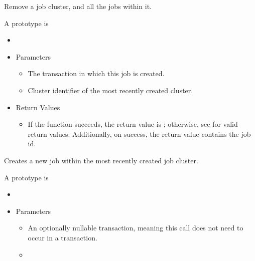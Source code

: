 \begin{description}
  Remove a job cluster, and all the jobs within it.
\item [\Code{newJob}]
  A prototype is 

  \begin{itemize}
    \item[] 
    \item[] Parameters
    \begin{itemize}
      \item[]  

      The transaction in which this job is created.
      \item[]  

      Cluster identifier of the most recently created cluster. 
    \end{itemize}
    \item[] Return Values
    \begin{itemize}
      \item[] If the function succeeds, the return value is ; 
      otherwise, see  for valid return values. Additionally,
      on success, the return value contains the job id.
    \end{itemize}
  \end{itemize}

  Creates a new job within the most recently created job cluster.
\item [\Code{removeJob}]
  A prototype is 

    \begin{itemize}
    \item[] 
    \item[] Parameters
    \begin{itemize}
      \item[]  

      An optionally nullable transaction, meaning this call does not 
      need to occur in a transaction. 
      \item[]  


\end{itemize}
\end{itemize}
\end{description}
